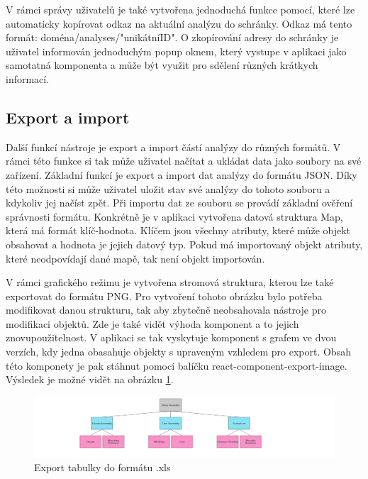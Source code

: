 V rámci správy uživatelů je také vytvořena jednoduchá funkce pomocí, které lze automaticky kopírovat odkaz na aktuální analýzu do schránky. Odkaz má tento formát: doména/analyses/"unikátníID". O zkopírování adresy do schránky je uživatel informován jednoduchým popup oknem, který vystupe v aplikaci jako samotatná komponenta a může být využit pro sdělení různých krátkych informací.  


\subsection{Export a import}
Další funkcí nástroje je export a import částí analýzy do různých formátů. V rámci této funkce si tak může uživatel načítat a ukládat data jako soubory na své zařízení. Základní funkcí je export a import dat analýzy do formátu JSON. Díky této možnosti si může uživatel uložit stav své analýzy do tohoto souboru a kdykoliv jej načíst zpět. Při importu dat ze souboru se provádí základní ověření správnosti formátu. Konkrétně je v aplikaci vytvořena datová struktura Map, která má formát klíč-hodnota. Klíčem jsou všechny atributy, které může objekt obsahovat a hodnota je jejich datový typ. Pokud má importovaný objekt atributy, které neodpovídají dané mapě, tak není objekt importován. 

V rámci grafického režimu je vytvořena stromová struktura, kterou lze také exportovat do formátu PNG. Pro vytvoření tohoto obrázku bylo potřeba modifikovat danou strukturu, tak aby zbytečně neobsahovala nástroje pro modifikaci objektů. Zde je také vidět výhoda komponent a to jejich znovupoužitelnost. V aplikaci se tak vyskytuje komponent s grafem ve dvou verzích, kdy jedna obasahuje objekty s upraveným vzhledem pro export. Obsah této komponety je pak stáhnut pomocí balíčku react-component-export-image\cite{exportIMG}. Výsledek je možné vidět na obrázku \ref{fig:graphPNG}.

\begin{figure}[h]
\centering
	\includegraphics[width=1.0\textwidth]{Figures/Relay_Assembly.png}
	\caption{Export tabulky do formátu .xls}
	\label{fig:graphPNG}
\end{figure}


